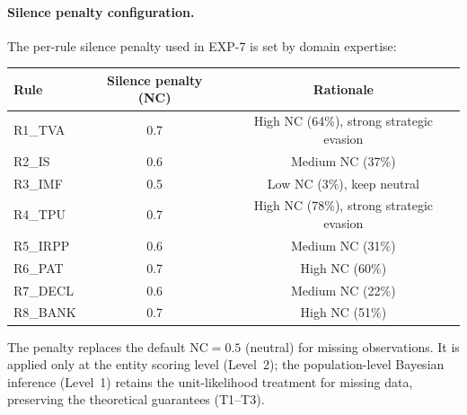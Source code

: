 \paragraph{Silence penalty configuration.}
The per-rule silence penalty used in EXP-7 is set by domain expertise:

\begin{center}
\renewcommand{\arraystretch}{1.15}
\begin{tabular}{lcc}
\toprule
\textbf{Rule} & \textbf{Silence penalty (NC)} & \textbf{Rationale} \\
\midrule
R1\_TVA  & 0.7 & High NC (64\%), strong strategic evasion \\
R2\_IS   & 0.6 & Medium NC (37\%) \\
R3\_IMF  & 0.5 & Low NC (3\%), keep neutral \\
R4\_TPU  & 0.7 & High NC (78\%), strong strategic evasion \\
R5\_IRPP & 0.6 & Medium NC (31\%) \\
R6\_PAT  & 0.7 & High NC (60\%) \\
R7\_DECL & 0.6 & Medium NC (22\%) \\
R8\_BANK & 0.7 & High NC (51\%) \\
\bottomrule
\end{tabular}
\end{center}

The penalty replaces the default $\mathrm{NC} = 0.5$ (neutral) for
missing observations. It is applied only at the entity scoring level
(Level~2); the population-level Bayesian inference (Level~1) retains
the unit-likelihood treatment for missing data, preserving the
theoretical guarantees (T1--T3).